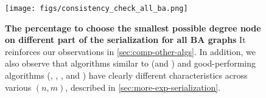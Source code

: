 \begin{figure}
    \centering
    \texttt{[image: figs/consistency\_check\_all\_ba.png]}
    \caption{\textbf{The percentage to choose the smallest possible degree node on different part of the serialization for all BA graphs} It reinforces our observations in \cref{sec:comp-other-algs}. In addition, we also observe that algorithms similar to \deggreedy (\deggreedy and \gflownets) and good-performing algorithms (\onlinemis, \redumis, \isco, and \lwd) have clearly different characteristics across various $(n,m)$, described in \cref{sec:more-exp-serialization}.}
    \label{fig:serial-ba}
\end{figure}